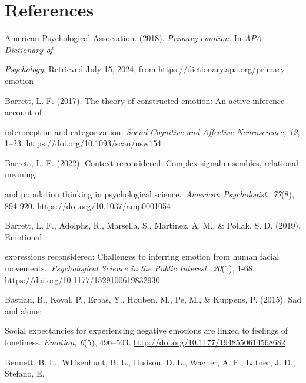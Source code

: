 \documentclass[authordate, empirical]{jote-new-article}
\begin{document}
	\section{References}



	American Psychological Association. (2018). \emph{Primary emotion}. In \emph{APA Dictionary of }



	\emph{Psychology}. Retrieved July 15, 2024, from \href{https://dictionary.apa.org/primary-emotion}{https://dictionary.apa.org/primary-emotion}



	Barrett, L. F. (2017). The theory of constructed emotion: An active inference account of



	interoception and categorization. \emph{Social Cognitive and Affective Neuroscience, 12}, 1--23. \href{https://doi.org/10.1093/scan/nsw154}{https://doi.org/10.1093/scan/nsw154}



	Barrett, L. F. (2022). Context reconsidered: Complex signal ensembles, relational meaning,



	and population thinking in psychological science. \emph{American Psychologist}, \emph{77}(8), 894-920. \href{https://doi.org/10.1037/amp0001054}{https://doi.org/10.1037/amp0001054}



	Barrett, L. F., Adolphs, R., Marsella, S., Martinez, A. M., \& Pollak, S. D. (2019). Emotional



	expressions reconsidered: Challenges to inferring emotion from human facial movements. \emph{Psychological Science in the Public Interest}, \emph{20}(1), 1-68. \href{https://doi.org/10.1177/1529100619832930}{https://doi.org/10.1177/1529100619832930}



	Bastian, B., Koval, P., Erbas, Y., Houben, M., Pe, M., \& Kuppens, P. (2015). Sad and alone:



	Social expectancies for experiencing negative emotions are linked to feelings of loneliness. \emph{Emotion, 6}(5), 496--503. \href{http://doi.org/10.1177/1948550614568682}{http://doi.org/10.1177/1948550614568682}



	Bennett, B. L., Whisenhunt, B. L., Hudson, D. L., Wagner, A. F., Latner, J. D., Stefano, E.
\end{document}
